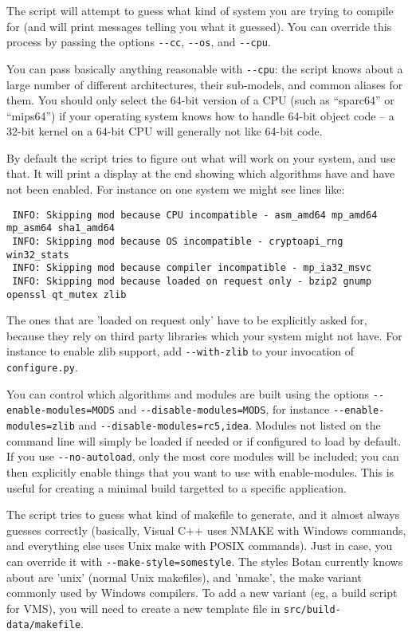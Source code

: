 \documentclass{article}
\newcommand{\filename}[1]{\texttt{#1}}
\begin{document}
The script will attempt to guess what kind of system you are trying
to compile for (and will print messages telling you what it guessed).
You can override this process by passing the options \verb|--cc|,
\verb|--os|, and \verb|--cpu|.

You can pass basically anything reasonable with \verb|--cpu|: the
script knows about a large number of different architectures, their
sub-models, and common aliases for them. You should only select the
64-bit version of a CPU (such as ``sparc64'' or ``mips64'') if your
operating system knows how to handle 64-bit object code -- a 32-bit
kernel on a 64-bit CPU will generally not like 64-bit code.

By default the script tries to figure out what will work on your
system, and use that. It will print a display at the end showing which
algorithms have and have not been enabled. For instance on one system
we might see lines like:

\begin{verbatim}
 INFO: Skipping mod because CPU incompatible - asm_amd64 mp_amd64 mp_asm64 sha1_amd64
 INFO: Skipping mod because OS incompatible - cryptoapi_rng win32_stats
 INFO: Skipping mod because compiler incompatible - mp_ia32_msvc
 INFO: Skipping mod because loaded on request only - bzip2 gnump openssl qt_mutex zlib
\end{verbatim}

The ones that are 'loaded on request only' have to be explicitly asked
for, because they rely on third party libraries which your system
might not have. For instance to enable zlib support, add
\verb|--with-zlib| to your invocation of \verb|configure.py|.

You can control which algorithms and modules are built using the
options \verb|--enable-modules=MODS| and
\verb|--disable-modules=MODS|, for instance
\verb|--enable-modules=zlib| and \verb|--disable-modules=rc5,idea|.
Modules not listed on the command line will simply be loaded if needed
or if configured to load by default. If you use \verb|--no-autoload|,
only the most core modules will be included; you can then explicitly
enable things that you want to use with enable-modules. This is useful
for creating a minimal build targetted to a specific application.

The script tries to guess what kind of makefile to generate, and it
almost always guesses correctly (basically, Visual C++ uses NMAKE with
Windows commands, and everything else uses Unix make with POSIX
commands). Just in case, you can override it with
\verb|--make-style=somestyle|. The styles Botan currently knows about
are 'unix' (normal Unix makefiles), and 'nmake', the make variant
commonly used by Windows compilers. To add a new variant (eg, a build
script for VMS), you will need to create a new template file in
\filename{src/build-data/makefile}.
\end{document}
